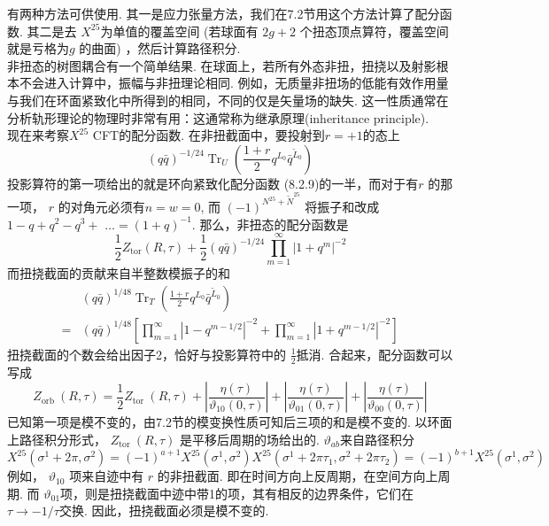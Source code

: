 有两种方法可供使用. 其一是应力张量方法，我们在7.2节用这个方法计算了配分函数. 其二是去 $X^{25}$为单值的覆盖空间 (若球面有 $2 g+2$ 个扭态顶点算符，覆盖空间就是亏格为$g$ 的曲面) ，然后计算路径积分.\\
非扭态的树图耦合有一个简单结果. 在球面上，若所有外态非扭，扭挠以及射影根本不会进入计算中，振幅与非扭理论相同. 例如，无质量非扭场的低能有效作用量与我们在环面紧致化中所得到的相同，不同的仅是矢量场的缺失. 这一性质通常在分析轨形理论的物理时非常有用：这通常称为继承原理(inheritance principle).\\
现在来考察$X^{25}$ CFT的配分函数. 在非扭截面中，要投射到$r=+1$的态上
\begin{equation}
	(q \bar{q})^{-1 / 24} \operatorname{Tr}_{U}\left(\frac{1+r}{2} q^{L_{0}} \bar{q}^{\tilde{L}_{0}}\right)
\end{equation}
投影算符的第一项给出的就是环向紧致化配分函数 (8.2.9)的一半，而对于有$r$ 的那一项， $r$ 的对角元必须有$n=w=0$, 而 $(-1)^{N^{25}+\tilde{N}^{25}}$ 将振子和改成 $1-q+q^{2}-q^{3}+$ $\ldots=(1+q)^{-1} $. 那么，非扭态的配分函数是
\begin{equation}
	\frac{1}{2} Z_{\mathrm{tor}}(R, \tau)+\frac{1}{2}(q \bar{q})^{-1 / 24} \prod_{m=1}^{\infty}\left|1+q^{m}\right|^{-2}
\end{equation}
而扭挠截面的贡献来自半整数模振子的和
\begin{equation}
	\begin{aligned}
		&(q \bar{q})^{1 / 48} \operatorname{Tr}_{T}\left(\frac{1+r}{2} q^{L_{0}} \bar{q}^{\tilde{L}_{0}}\right) \\
		=&(q \bar{q})^{1 / 48}\left[\prod_{m=1}^{\infty}\left|1-q^{m-1 / 2}\right|^{-2}+\prod_{m=1}^{\infty}\left|1+q^{m-1 / 2}\right|^{-2}\right]
	\end{aligned}
\end{equation}
扭挠截面的个数会给出因子2，恰好与投影算符中的 $\frac{1}{2}$抵消. 合起来，配分函数可以写成
\begin{equation}
	Z_{\text {orb }}(R, \tau)=\frac{1}{2} Z_{\text {tor }}(R, \tau)+\left|\frac{\eta(\tau)}{\vartheta_{10}(0, \tau)}\right|+\left|\frac{\eta(\tau)}{\vartheta_{01}(0, \tau)}\right|+\left|\frac{\eta(\tau)}{\vartheta_{00}(0, \tau)}\right|
\end{equation}
已知第一项是模不变的，由7.2节的模变换性质可知后三项的和是模不变的. 以环面上路径积分形式， $Z_{\text {tor }}(R, \tau)$ 是平移后周期的场给出的.  $\vartheta_{a b}$来自路径积分
\begin{subequations}
\begin{equation}
		X^{25}\left(\sigma^{1}+2 \pi, \sigma^{2}\right) =(-1)^{a+1} X^{25}\left(\sigma^{1}, \sigma^{2}\right) 
\end{equation}
\begin{equation}		
		X^{25}\left(\sigma^{1}+2 \pi \tau_{1}, \sigma^{2}+2 \pi \tau_{2}\right) =(-1)^{b+1} X^{25}\left(\sigma^{1}, \sigma^{2}\right)
\end{equation}
\end{subequations}
例如， $\vartheta_{10}$ 项来自迹中有 $r$ 的非扭截面. 即在时间方向上反周期，在空间方向上周期. 而 $\vartheta_{01}$项，则是扭挠截面中迹中带1的项，其有相反的边界条件，它们在 $\tau \rightarrow-1 / \tau$交换. 因此，扭挠截面必须是模不变的.

